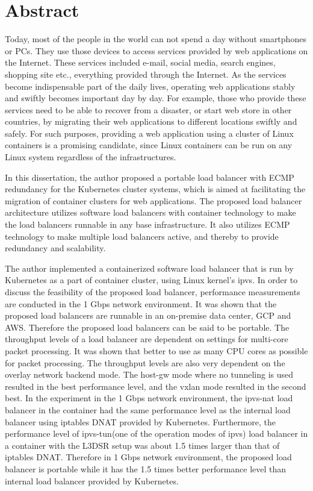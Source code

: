 \chapter*{Abstract}

Today, most of the people in the world can not spend a day without smartphones or PCs.
They use those devices to access services provided by web applications on the Internet.
These services included e-mail, social media, search engines, shopping site etc., everything provided through the Internet.
As the services become indispensable part of the daily lives, operating web applications stably and swiftly becomes important day by day.
For example, those who provide these services need to be able to recover from a disaster, or start web store in other countries,
by migrating their web applications to different locations swiftly and safely.
For such purposes, providing a web application using a cluster of Linux containers is a promising candidate, since Linux containers can be run on any Linux system regardless of the infrastructures.


In this dissertation, the author proposed a portable load balancer with ECMP redundancy for the Kubernetes cluster systems, which is aimed at facilitating the migration of container clusters for web applications.
The proposed load balancer architecture utilizes software load balancers with container technology to make the load balancers runnable in any base infrastructure.
It also utilizes ECMP technology to make multiple load balancers active, and thereby to provide redundancy and scalability.


The author implemented a containerized software load balancer that is run by Kubernetes as a part of container cluster, using Linux kernel's ipvs.
In order to discuss the feasibility of the proposed load balancer, performance measurements are conducted in the 1 Gbps network environment.
It was shown that the proposed load balancers are runnable in an on-premise data center, GCP and AWS.
Therefore the proposed load balancers can be said to be portable.
The throughput levels of a load balancer are dependent on settings for multi-core packet processing.
It was shown that better to use as many CPU cores as possible for packet processing.
The throughput levels are also very dependent on the overlay network backend mode.
The host-gw mode where no tunneling is used resulted in the best performance level, and the vxlan mode resulted in the second best.
In the experiment in the 1 Gbps network environment, the ipvs-nat load balancer in the container had the same performance level as the internal load balancer using iptables DNAT provided by Kubernetes.
Furthermore, the performance level of ipvs-tun(one of the operation modes of ipvs) load balancer in a container with the L3DSR setup was about 1.5 times larger than that of iptables DNAT.
Therefore in 1 Gbps network environment, the proposed load balancer is portable while it has the 1.5 times better performance level than internal load balancer provided by Kubernetes.

